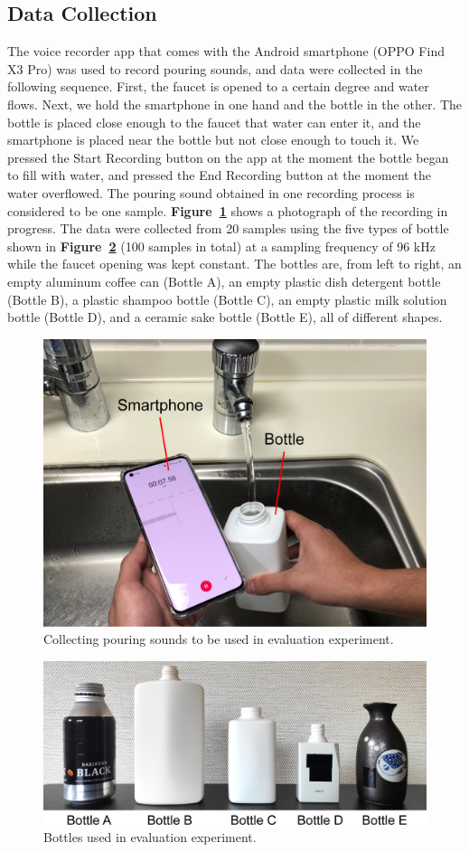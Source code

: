\documentclass[manuscript,screen,review]{acmart}
\newcommand\figref[1]{\textbf{Figure~\ref{fig:#1}}}
\begin{document}
\subsection{Data Collection}
The voice recorder app that comes with the Android smartphone (OPPO Find X3 Pro) was used to record pouring sounds, and data were collected in the following sequence. First, the faucet is opened to a certain degree and water flows. Next, we hold the smartphone in one hand and the bottle in the other. The bottle is placed close enough to the faucet that water can enter it, and the smartphone is placed near the bottle but not close enough to touch it. We pressed the Start Recording button on the app at the moment the bottle began to fill with water, and pressed the End Recording button at the moment the water overflowed. The pouring sound obtained in one recording process is considered to be one sample. \figref{data_acquisition} shows a photograph of the recording in progress. The data were collected from 20 samples using the five types of bottle shown in \figref{bottles} (100 samples in total) at a sampling frequency of 96 kHz while the faucet opening was kept constant. The bottles are, from left to right, an empty aluminum coffee can (Bottle A), an empty plastic dish detergent bottle (Bottle B), a plastic shampoo bottle (Bottle C), an empty plastic milk solution bottle (Bottle D), and a ceramic sake bottle (Bottle E), all of different shapes.

\begin{figure}[!t]
  \centering
  \includegraphics[width=0.8\linewidth]{figures/data_acquisition.eps}
  \caption{Collecting pouring sounds to be used in evaluation experiment.}
  \label{fig:data_acquisition}
\end{figure}

\begin{figure}[!t]
  \centering
  \includegraphics[width=0.8\linewidth]{figures/bottles.eps}
  \caption{Bottles used in evaluation experiment.}
  \label{fig:bottles}
\end{figure}
\end{document}
